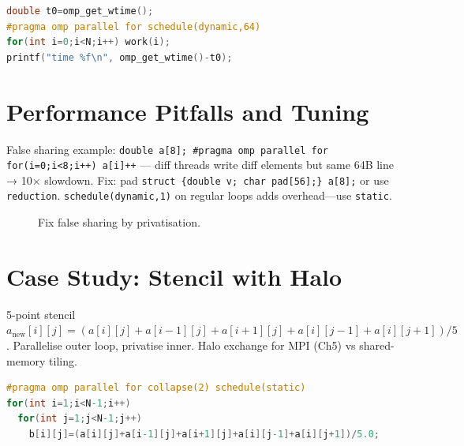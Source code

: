 \begin{center}
\begin{lstlisting}[language=C,caption={Choosing schedule by measurement.}]
double t0=omp_get_wtime();
#pragma omp parallel for schedule(dynamic,64)
for(int i=0;i<N;i++) work(i);
printf("time %f\n", omp_get_wtime()-t0);
\end{lstlisting}
\end{center}

\section{Performance Pitfalls and Tuning}\label{sec:pifalls}
False sharing example: \texttt{double a[8]; \#pragma omp parallel for for(i=0;i<8;i++) a[i]++} — diff threads write diff elements but same 64B line → 10× slowdown. Fix: pad \texttt{struct \{double v; char pad[56];\} a[8];} or use \texttt{reduction}. \texttt{schedule(dynamic,1)} on regular loops adds overhead—use \texttt{static}.

\begin{figure}[h]\centering
{}
\caption{Fix false sharing by privatisation.}
\label{fig:falseshare}
\end{figure}


\section{Case Study: Stencil with Halo}\label{sec:stencil}
5-point stencil $a_{\text{new}}[i][j]=(a[i][j]+a[i-1][j]+a[i+1][j]+a[i][j-1]+a[i][j+1])/5$. Parallelise outer loop, privatise inner. Halo exchange for MPI (Ch5) vs shared-memory tiling.

\begin{lstlisting}[language=C,caption={OpenMP stencil with collapse and tiling.}]
#pragma omp parallel for collapse(2) schedule(static)
for(int i=1;i<N-1;i++)
  for(int j=1;j<N-1;j++)
    b[i][j]=(a[i][j]+a[i-1][j]+a[i+1][j]+a[i][j-1]+a[i][j+1])/5.0;
\end{lstlisting}

